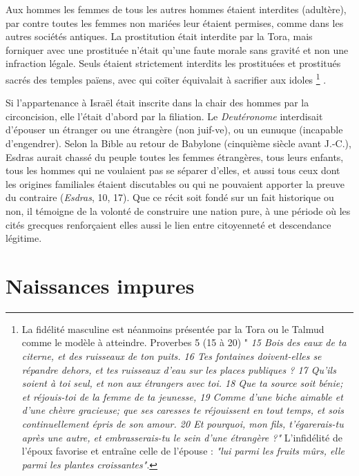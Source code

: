  Aux hommes les femmes de tous les autres hommes étaient interdites (adultère), par contre toutes les femmes non mariées leur étaient permises, comme dans les autres sociétés antiques. La prostitution était interdite par la Tora, mais forniquer avec une prostituée n'était qu'une faute morale sans gravité et non une infraction légale. Seuls étaient strictement interdits les prostituées et prostitués sacrés des temples païens, avec qui coïter équivalait à sacrifier aux idoles%
\footnote{La fidélité masculine est néanmoins présentée par la Tora ou le Talmud comme le modèle à atteindre. Proverbes 5 (15 à 20) "\emph{
15 Bois des eaux de ta citerne, et des ruisseaux de ton puits.
16 Tes fontaines doivent-elles se répandre dehors, et tes ruisseaux d'eau sur les places publiques ?
17 Qu'ils soient à toi seul, et non aux étrangers avec toi.
18 Que ta source soit bénie; et réjouis-toi de la femme de ta jeunesse,
19 Comme d'une biche aimable et d'une chèvre gracieuse; que ses caresses te réjouissent en tout temps, et sois continuellement épris de son amour.
20 Et pourquoi, mon fils, t'égarerais-tu après une autre, et embrasserais-tu le sein d'une étrangère ?"} L'infidélité de l'époux favorise et entraîne celle de l'épouse : \emph{"lui parmi les fruits mûrs, elle parmi les plantes croissantes"}. 
}%
. 

 



 
 
 



Si l'appartenance à Israël était inscrite dans la chair des hommes par la circoncision,  elle l'était d'abord par la filiation. Le \emph{Deutéronome} interdisait d'épouser un étranger ou une étrangère (non juif-ve), ou un eunuque (incapable d'engendrer). Selon la Bible au retour de Babylone (cinquième siècle avant J.-C.), Esdras aurait chassé du peuple toutes les femmes étrangères, tous leurs enfants, tous les hommes qui ne voulaient pas se séparer d'elles, et aussi tous ceux dont les origines familiales étaient discutables ou qui ne pouvaient apporter la preuve du contraire (\emph{Esdras}, 10, 17). Que ce récit soit fondé sur un fait historique ou non, il témoigne de la volonté de construire une nation pure, à une période où les cités grecques renforçaient elles aussi le lien entre citoyenneté et descendance légitime. 

\section{Naissances impures}
 
